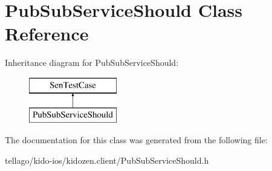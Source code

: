 \hypertarget{interface_pub_sub_service_should}{\section{Pub\-Sub\-Service\-Should Class Reference}
\label{interface_pub_sub_service_should}
}
Inheritance diagram for Pub\-Sub\-Service\-Should\-:\begin{figure}[H]
\begin{center}
\leavevmode
\includegraphics[height=2.000000cm]{interface_pub_sub_service_should}
\end{center}
\end{figure}


The documentation for this class was generated from the following file\-:\begin{DoxyCompactItemize}
\item 
tellago/kido-\/ios/kidozen.\-client/Pub\-Sub\-Service\-Should.\-h\end{DoxyCompactItemize}

